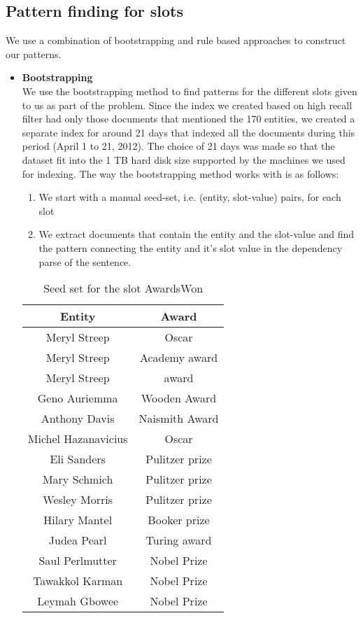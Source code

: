 \subsection{Pattern finding for slots}
We use a combination of bootstrapping and rule based approaches to construct our patterns.
\begin{itemize}[label={}]
\item \textbf{Bootstrapping} \\
We use the bootstrapping method to find patterns for the different slots given to us as part of the problem. Since the index we created based on high recall filter had only those documents that mentioned the 170 entities, we created a separate index for around 21 days that indexed all the documents during this period (April 1 to 21, 2012). The choice of 21 days was made so that the dataset fit into the 1 TB hard disk size supported by the machines we used for indexing. The way the bootstrapping method works with is as follows:
\begin{enumerate}
\item We start with a manual seed-set, i.e. (entity, slot-value) pairs, for each slot
\item We extract documents that contain the entity and the slot-value and find the pattern connecting the entity and it’s slot value in the dependency parse of the sentence. 
\end{enumerate}

\begin{table*}[ht]
\centering
\begin{tabular}{|c|c|}
\hline
Entity & Award \\
\hline
Meryl Streep & Oscar \\
Meryl Streep & Academy award \\
Meryl Streep & award \\
Geno Auriemma & Wooden Award \\
Anthony Davis & Naismith Award \\
Michel Hazanavicius & Oscar \\
Eli Sanders & Pulitzer prize \\ 
Mary Schmich & Pulitzer prize \\
Wesley Morris & Pulitzer prize \\
Hilary Mantel & Booker prize \\
Judea Pearl & Turing award \\
Saul Perlmutter & Nobel Prize \\
Tawakkol Karman & Nobel Prize \\ 
Leymah Gbowee & Nobel Prize \\
\hline
\end{tabular}
\caption{Seed set for the slot AwardsWon}
\label{tab:seedset_awardsWon}
\end{table*}



\end{itemize}

